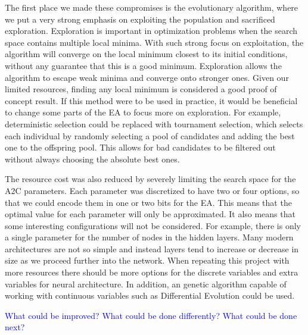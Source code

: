 \documentclass{article}
\newcommand{\TODO}[1]{\textcolor{blue}{#1}}
\begin{document}
The first place we made these compromises is the evolutionary algorithm, where we put a very strong emphasis on exploiting the population and sacrificed exploration. Exploration is important in optimization problems when the search space contains multiple local minima. 
With such strong focus on exploitation, the algorithm will converge on the local minimum closest to its initial conditions, without any guarantee that this is a good minimum. Exploration allows the algorithm to escape weak minima and converge onto stronger ones. 
Given our limited resources, finding any local minimum is considered a good proof of concept result. If this method were to be used in practice, it would be beneficial to change some parts of the EA to focus more on exploration.
For example, deterministic selection could be replaced with tournament selection, which selects each individual by randomly selecting a pool of candidates and adding the best one to the offspring pool. This allows for bad candidates to be filtered out without always choosing the absolute best ones. 

The resource cost was also reduced by severely limiting the search space for the A2C parameters. Each parameter was discretized to have two or four options, so that we could encode them in one or two bits for the EA. 
This means that the optimal value for each parameter will only be approximated. It also means that some interesting configurations will not be considered. For example, there is only a single parameter for the number of nodes in the hidden layers. Many modern architectures are not so simple and instead layers tend to increase or decrease in size as we proceed further into the network. 
When repeating this project with more resources there should be more options for the discrete variables and extra variables for neural architecture. In addition, an genetic algorithm capable of working with continuous variables such as Differential Evolution \cite{DifferentialEvolution} could be used.  


\TODO{
    What could be improved?
    What could be done differently?
    What could be done next?
}


\end{document}
